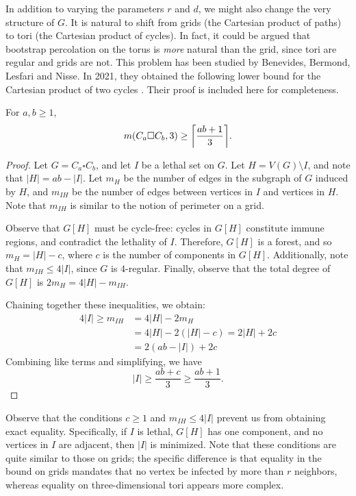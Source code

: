 In addition to varying the parameters $r$ and $d$, we might also change the very structure of $G$. It is natural to shift from grids (the Cartesian product of paths) to tori (the Cartesian product of cycles). In fact, it could be argued that bootstrap percolation on the torus is \emph{more} natural than the grid, since tori are regular and grids are not. This problem has been studied by Benevides, Bermond, Lesfari and Nisse. In 2021, they obtained the following lower bound for the Cartesian product of two cycles \cite{benevides:2021}. Their proof is included here for completeness.

\begin{thm}
\label{thm:torus_lb}
For $a, b \geq 1$,
$$m(C_a \square C_b,3) \geq \ceil*{\frac{ab +1}{3}}.$$
\end{thm}

\begin{proof}
Let $G = C_a \square C_b$, and let $I$ be a lethal set on $G$. Let $H = V(G) \setminus I$, and note that $|H| = ab - |I|$. Let $m_{H}$ be the number of edges in the subgraph of $G$ induced by $H$, and $m_{IH}$ be the number of edges between vertices in $I$ and vertices in $H$. Note that $m_{IH}$ is similar to the notion of perimeter on a grid.

Observe that $G[H]$ must be cycle-free: cycles in $G[H]$ constitute immune regions, and contradict the lethality of $I$. Therefore, $G[H]$ is a forest, and so $m_H = |H| - c$, where $c$ is the number of components in $G[H]$. Additionally, note that $m_{IH} \leq 4|I|$, since $G$ is $4$-regular. Finally, observe that the total degree of $G[H]$ is $2m_H = 4|H| - m_{IH}$.

Chaining together these inequalities, we obtain:
\begin{align*}
4|I| \geq m_{IH} &= 4|H| - 2m_H \\
&= 4|H| - 2(|H| -c) = 2|H| + 2c \\
&= 2(ab-|I|) + 2c
\end{align*}
Combining like terms and simplifying, we have
$$|I| \geq \frac{ab +c}{3} \geq \frac{ab +1}{3}.$$
\end{proof}

Observe that the conditions $c \geq 1$ and $m_{IH} \leq 4|I|$ prevent us from obtaining exact equality. Specifically, if $I$ is lethal, $G[H]$ has one component, and no vertices in $I$ are adjacent, then $|I|$ is minimized. Note that these conditions are quite similar to those on grids; the specific difference is that equality in the bound on grids mandates that no vertex be infected by more than $r$ neighbors, whereas equality on three-dimensional tori appears more complex.

